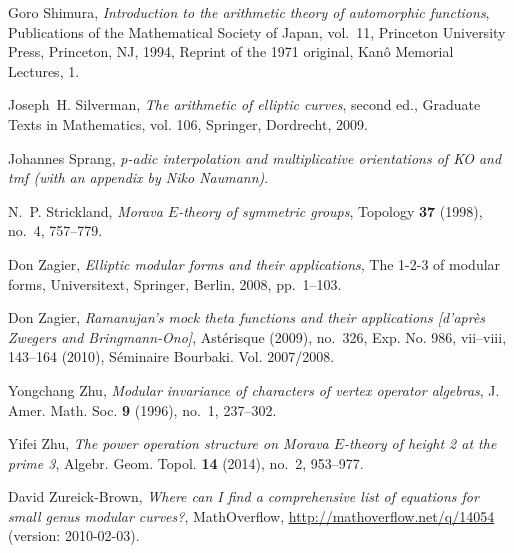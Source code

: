\documentclass{gtpart}
\theoremstyle{definition}
\theoremstyle{remark}
\renewcommand{\=}{\approx}
\renewcommand{\-}{\sim}
\numberwithin{equation}{section}
\begin{document}
\begin{thebibliography}
Goro Shimura, \emph{Introduction to the arithmetic theory of automorphic
  functions}, Publications of the Mathematical Society of Japan, vol.~11,
  Princeton University Press, Princeton, NJ, 1994, Reprint of the 1971
  original, Kan{\^o} Memorial Lectures, 1. 

Joseph~H. Silverman, \emph{The arithmetic of elliptic curves}, second ed.,
  Graduate Texts in Mathematics, vol. 106, Springer, Dordrecht, 2009.

Johannes Sprang, \emph{p-adic interpolation and multiplicative orientations of
  {KO} and tmf (with an appendix by {N}iko {N}aumann)}. 

N.~P. Strickland, \emph{Morava {$E$}-theory of symmetric groups}, Topology
  \textbf{37} (1998), no.~4, 757--779. 

Don Zagier, \emph{Elliptic modular forms and their applications}, The 1-2-3 of
  modular forms, Universitext, Springer, Berlin, 2008, pp.~1--103. 

Don Zagier, \emph{Ramanujan's mock theta functions and their applications
  [d'apr\`es {Z}wegers and {B}ringmann-{O}no]}, Ast\'erisque (2009), no.~326,
  Exp. No. 986, vii--viii, 143--164 (2010), S{\'e}minaire Bourbaki. Vol.
  2007/2008. 

Yongchang Zhu, \emph{Modular invariance of characters of vertex operator
  algebras}, J. Amer. Math. Soc. \textbf{9} (1996), no.~1, 237--302.

Yifei Zhu, \emph{The power operation structure on {M}orava {$E$}-theory of
  height 2 at the prime 3}, Algebr. Geom. Topol. \textbf{14} (2014), no.~2,
  953--977. 

David Zureick-Brown,
  \emph{Where can {I} find a comprehensive list of equations for small genus
  modular curves?}, MathOverflow, \href{http://mathoverflow.net/q/14054}
  {http://mathoverflow.net/q/14054} (version: 2010-02-03).\\
\end{thebibliography}
\end{document}
